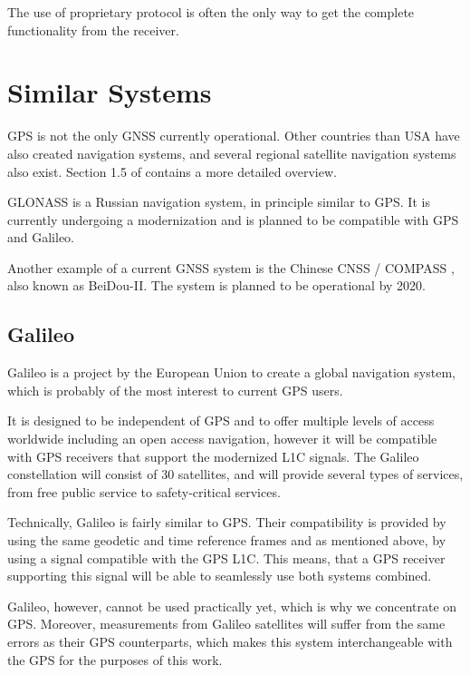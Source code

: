 The use of proprietary protocol is often the only way to get the complete functionality from
the receiver.

\section{Similar Systems}
\label{sec:gps-alternatives}

GPS is not the only GNSS currently operational.
Other countries than USA have also created navigation systems, and several regional satellite
navigation systems also exist.
Section 1.5 of \cite{david} contains a more detailed overview.

GLONASS \cite{glonass} is a Russian navigation system, in principle similar to GPS.
It is currently undergoing a modernization and is planned to be compatible with GPS and Galileo.

Another example of a current GNSS system is the Chinese CNSS / COMPASS \cite{compass},
also known as  BeiDou-II.
The system is planned to be operational by 2020.

\subsection{Galileo}
\label{sec:galileo}

Galileo \cite{galileo} is a project by the European Union to create a global navigation system, which
is probably of the most interest to current GPS users.

It is designed to be independent of GPS and to offer multiple levels of access worldwide
including an open access navigation, however
it will be compatible with GPS receivers that support the modernized L1C signals.
The Galileo constellation will consist of 30 satellites, and will provide several types of services,
from free public service to safety-critical services.

Technically, Galileo is fairly similar to GPS.
Their compatibility is provided by using the same geodetic and time reference frames
and as mentioned above, by using a signal compatible with the GPS L1C.
This means, that a GPS receiver supporting this signal will be able to seamlessly
use both systems combined.

Galileo, however, cannot be used practically yet, which is why we concentrate on GPS.
Moreover, measurements from Galileo satellites will suffer from the same errors as
their GPS counterparts, which makes this system interchangeable with the GPS for the purposes
of this work.
